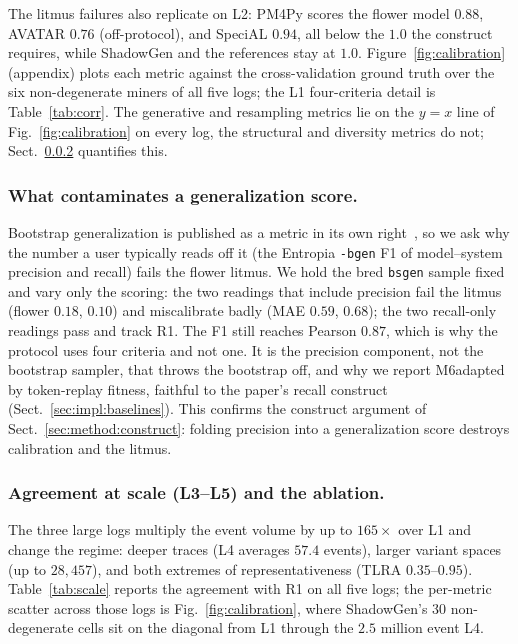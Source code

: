 \documentclass[runningheads]{llncs}
\newcommand{\chg}[1]{#1}
\begin{document}
The litmus failures also replicate on L2: PM4Py scores the flower model $0.88$, AVATAR $0.76$ \chg{(off-protocol)}, and SpeciAL $0.94$, all below the $1.0$ the construct requires, while \chg{ShadowGen} and the references stay at $1.0$.
Figure~\ref{fig:calibration} (appendix) plots each metric against the cross-validation ground truth over the six non-degenerate miners of all five logs; the L1 four-criteria detail is Table~\ref{tab:corr}. The generative and resampling metrics lie on the $y{=}x$ line of Fig.~\ref{fig:calibration} on every log, the structural and diversity metrics do not; Sect.~\ref{sec:eval:scale} quantifies this.

\subsubsection{What contaminates a generalization score.}
\label{sec:eval:m6}
Bootstrap generalization is published as a metric in its own right~\cite{polyvyanyy2022bootstrap}, so we ask why the number a user typically reads off it (the Entropia \texttt{-bgen} F1 of model--system precision and recall) fails the flower litmus. We hold the bred \texttt{bsgen} sample fixed and vary only the scoring: the two readings that include precision fail the litmus (flower $0.18$, $0.10$) and miscalibrate badly (MAE $0.59$, $0.68$); the two recall-only readings pass and track R1. The F1 still reaches Pearson $0.87$, which is why the protocol uses four criteria and not one. It is the precision component, not the bootstrap sampler, that throws the bootstrap off, and why we report M6adapted by token-replay fitness, faithful to the paper's recall construct (Sect.~\ref{sec:impl:baselines}). This confirms the construct argument of Sect.~\ref{sec:method:construct}: folding precision into a generalization score destroys calibration and the litmus.

\subsubsection{Agreement at scale (L3--L5) and the ablation.}
\label{sec:eval:scale}
The three large logs multiply the event volume by up to $165\times$ over L1 and change the regime: deeper traces (L4 averages $57.4$ events), larger variant spaces (up to $28{,}457$), and both extremes of representativeness (TLRA $0.35$--$0.95$). Table~\ref{tab:scale} reports the agreement with R1 on all five logs; the per-metric scatter across those logs is Fig.~\ref{fig:calibration}, where ShadowGen's 30 non-degenerate cells sit on the diagonal from L1 through the $2.5$ million event L4.
\end{document}
